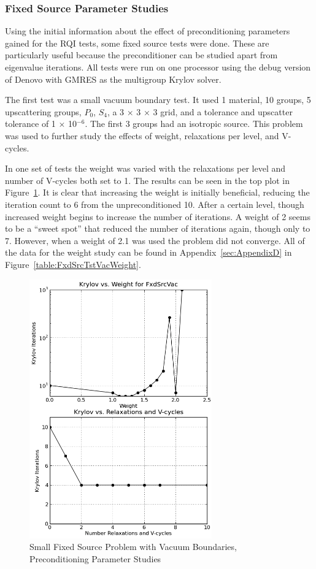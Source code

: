 \subsubsection{Fixed Source Parameter Studies}
Using the initial information about the effect of preconditioning parameters gained for the RQI tests, some fixed source tests were done. These are particularly useful because the preconditioner can be studied apart from eigenvalue iterations. All tests were run on one processor using the debug version of Denovo with GMRES as the multigroup Krylov solver.

The first test was a small vacuum boundary test. It used 1 material, 10 groups, 5 upscattering groups, $P_{0}$, $S_{4}$, a 3 $\times$ 3 $\times$ 3 grid, and a tolerance and upscatter tolerance of 1 $\times$ 10$^{-6}$. The first 3 groups had an isotropic source. This problem was used to further study the effects of weight, relaxations per level, and V-cycles.

In one set of tests the weight was varied with the relaxations per level and number of V-cycles both set to 1. The results can be seen in the top plot in Figure~\ref{fig:FxdSrcVac}. It is clear that increasing the weight is initially beneficial, reducing the iteration count to 6 from the unpreconditioned 10. After a certain level, though increased weight begins to increase the number of iterations. A weight of 2 seems to be a ``sweet spot'' that reduced the number of iterations again, though only to 7. However, when a weight of 2.1 was used the problem did not converge. All of the data for the weight study can be found in Appendix~\ref{sec:AppendixD} in Figure~\ref{table:FxdSrcTstVacWeight}.
%
\begin{figure}[!ht]
    \begin{center}
      \includegraphics [width=0.7\textwidth, height=0.8\textheight] {FxdSrcVac}
   \end{center}
   \caption{Small Fixed Source Problem with Vacuum Boundaries, Preconditioning Parameter Studies}
   \label{fig:FxdSrcVac}
\end{figure}

